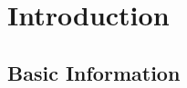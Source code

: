 \documentclass[11pt,
  english,
  a4paper,
]{article}
\begin{document}
\setlength\parskip{0.5em plus 0.1em minus 0.2em}


\hypertarget{introduction}{%
\section{Introduction}\label{introduction}}

\leavevmode\tagmcend\tagstructend


\hypertarget{basic-information}{%
\subsection{Basic Information}\label{basic-information}}

\leavevmode\tagmcend\tagstructend

\end{document}
